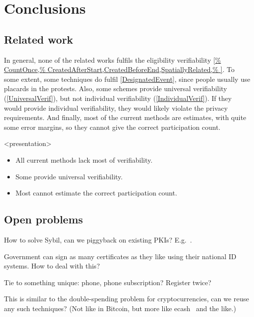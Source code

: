 \mode*
\section{Conclusions}

\subsection<presentation>{Related work}

In general, none of the related works fulfils the eligibility verifiability 
\cref{%
  CountOnce,%
  CreatedAfterStart,CreatedBeforeEnd,SpatiallyRelated,%
}.
To some extent, some techniques do fulfil \cref{DesignatedEvent}, since people 
usually use placards in the protests.
Also, some schemes provide universal verifiability (\cref{UniversalVerif}), but 
not individual verifiability (\cref{IndividualVerif}).
If they would provide individual verifiability, they would likely violate the 
privacy requirements.
And finally, most of the current methods are estimates, with quite some error 
margins, so they cannot give the correct participation count.

\begin{frame}<presentation>
  \begin{remark}
    \begin{itemize}
      \item All current methods lack most of verifiability.
      \item Some provide universal verifiability.

        \pause{}

      \item Most cannot estimate the correct participation count.
    \end{itemize}
  \end{remark}
\end{frame}

\subsection{Open problems}

\begin{frame}
  \begin{question}
    How to solve Sybil, can we piggyback on existing \acp{PKI}?
    E.g.~\cite{Cinderella}.
  \end{question}

  \begin{question}
    Government can sign as many certificates as they like using their national 
    ID systems.
    How to deal with this?
  \end{question}

  \begin{question}
    Tie to something unique: phone, phone subscription?
    Register twice?
  \end{question}

  \begin{question}
    This is similar to the double-spending problem for cryptocurrencies, can 
    we reuse any such techniques?
    (Not like in Bitcoin, but more like ecash~\cite{ecash} and the like.)
  \end{question}
\end{frame}


